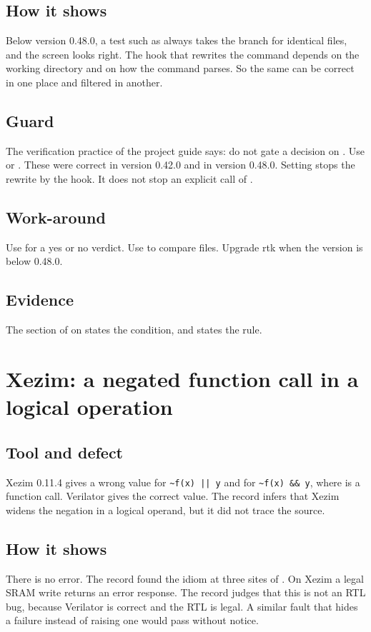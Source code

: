 \subsection*{How it shows}
Below version 0.48.0, a test such as  always takes the branch for identical files, and the screen looks right. The hook that rewrites the command depends on the working directory and on how the command parses. So the same  can be correct in one place and filtered in another.

\subsection*{Guard}
The verification practice of the project guide says: do not gate a decision on . Use  or . These were correct in version 0.42.0 and in version 0.48.0. Setting  stops the rewrite by the hook. It does not stop an explicit call of .

\subsection*{Work-around}
Use  for a yes or no verdict. Use  to compare files. Upgrade rtk when the version is below 0.48.0.

\subsection*{Evidence}
The section of  on  states the condition, and  states the rule.

\section{Xezim: a negated function call in a logical operation}\label{tm:defect:xezim-negated-call}
\subsection*{Tool and defect}
Xezim 0.11.4 gives a wrong value for \texttt{\textasciitilde f(x) || y} and for \texttt{\textasciitilde f(x) \&\& y}, where  is a function call. Verilator gives the correct value. The record infers that Xezim widens the negation in a logical operand, but it did not trace the source.

\subsection*{How it shows}
There is no error. The record found the idiom at three sites of . On Xezim a legal SRAM write returns an error response. The record judges that this is not an RTL bug, because Verilator is correct and the RTL is legal. A similar fault that hides a failure instead of raising one would pass without notice.

